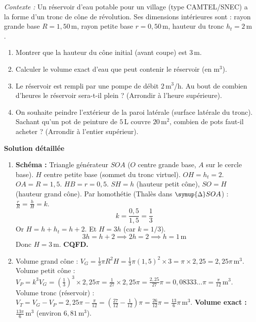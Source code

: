 \documentclass[11pt]{article}
\def\triangle{\mathord{\scalebox{0.9}{$\symup{\Delta}$}}}%
\begin{document}
\begin{exoresolu}
    \emph{Contexte :} Un réservoir d'eau potable pour un village (type CAMTEL/SNEC) a la forme d'un tronc de cône de révolution. Ses dimensions intérieures sont : rayon grande base $R = 1,50\,\text{m}$, rayon petite base $r = 0,50\,\text{m}$, hauteur du tronc $h_t = 2\,\text{m}$.
    \begin{enumerate}
        \item Montrer que la hauteur du cône initial (avant coupe) est $3\,\text{m}$.
        \item Calculer le volume exact d'eau que peut contenir le réservoir (en $\text{m}^3$).
        \item Le réservoir est rempli par une pompe de débit $2\,\text{m}^3/\text{h}$. Au bout de combien d'heures le réservoir sera-t-il plein ? (Arrondir à l'heure supérieure).
        \item On souhaite peindre l'extérieur de la paroi latérale (surface latérale du tronc). Sachant qu'un pot de peinture de $5\,\text{L}$ couvre $20\,\text{m}^2$, combien de pots faut-il acheter ? (Arrondir à l'entier supérieur).
    \end{enumerate}
    \tcblower
    \textbf{Solution détaillée}
    \begin{enumerate}
        \item \textbf{Schéma :} Triangle générateur $SOA$ ($O$ centre grande base, $A$ sur le cercle base). $H$ centre petite base (sommet du tronc virtuel). $OH = h_t = 2$. $OA = R = 1,5$. $HB = r = 0,5$. $SH = h$ (hauteur petit cône), $SO = H$ (hauteur grand cône).
            Par homothétie (Thalès dans $\triangle SOA$) : $\frac{r}{R} = \frac{h}{H} = k$.
            \[ k = \frac{0,5}{1,5} = \frac{1}{3} \]
            Or $H = h + h_t = h + 2$. Et $H = 3h$ (car $k=1/3$).
            \[ 3h = h + 2 \implies 2h = 2 \implies h = 1\,\text{m} \]
            Donc $H = 3\,\text{m}$. \textbf{CQFD.}
        \item Volume grand cône : $V_G = \frac{1}{3}\pi R^2 H = \frac{1}{3}\pi (1,5)^2 \times 3 = \pi \times 2,25 = 2,25\pi\,\text{m}^3$.
            Volume petit cône : $V_P = k^3 V_G = \left(\frac{1}{3}\right)^3 \times 2,25\pi = \frac{1}{27} \times 2,25\pi = \frac{2,25}{27}\pi = 0,08333...\pi = \frac{\pi}{12}\,\text{m}^3$.
            Volume tronc (réservoir) : $V_T = V_G - V_P = 2,25\pi - \frac{\pi}{12} = \left(\frac{27}{12} - \frac{1}{12}\right)\pi = \frac{26}{12}\pi = \frac{13}{6}\pi\,\text{m}^3$.
            \textbf{Volume exact : $\frac{13\pi}{6}\,\text{m}^3$} (environ $6,81\,\text{m}^3$).

\end{enumerate}
\end{exoresolu}
\end{document}
